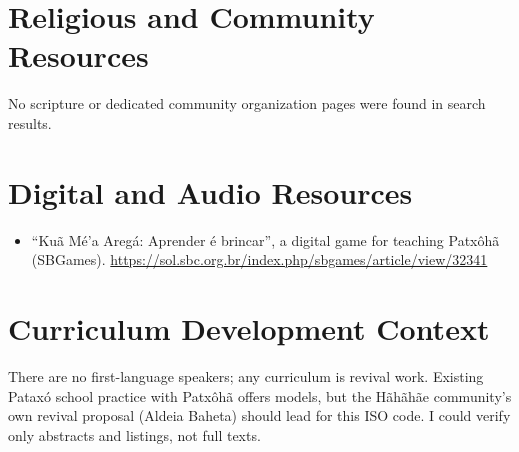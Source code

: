 \documentclass[12pt]{article}
\begin{document}
\section{Religious and Community Resources}
No scripture or dedicated community organization pages were found in search results.

\section{Digital and Audio Resources}
\begin{itemize}
\item ``Kuã Mé'a Aregá: Aprender é brincar'', a digital game for teaching Patxôhã (SBGames). \url{https://sol.sbc.org.br/index.php/sbgames/article/view/32341}
\end{itemize}

\section{Curriculum Development Context}
There are no first-language speakers; any curriculum is revival work. Existing Pataxó school practice with Patxôhã offers models, but the Hãhãhãe community's own revival proposal (Aldeia Baheta) should lead for this ISO code. I could verify only abstracts and listings, not full texts.
\end{document}
